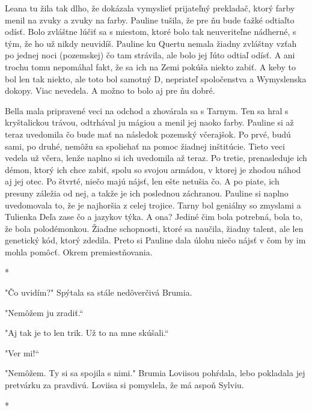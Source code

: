 \documentclass{book}
\begin{document}
Leana tu žila tak dlho, že dokázala vymyslieť prijateľný prekladač, ktorý farby menil na zvuky a zvuky na farby. Pauline tušila, že pre ňu bude ťažké odtiaľto odísť. Bolo zvláštne lúčiť sa s miestom, ktoré bolo tak neuveriteľne nádherné, s tým, že ho už nikdy neuvidíš. Pauline ku Quertu nemala žiadny zvláštny vzťah po jednej noci (pozemskej) čo tam strávila, ale bolo jej ľúto odtiaľ odísť. A ani trochu tomu nepomáhal fakt, že sa ich na Zemi pokúša niekto zabiť. A keby to bol len tak niekto, ale toto bol samotný D, nepriateľ spoločenstva a Wymyslenska dokopy. Viac nevedela. A možno to bolo aj pre ňu dobré.

Bella mala pripravené veci na odchod a zhovárala sa s Tarnym. Ten sa hral s kryštalickou trávou, odtrhával ju mágiou a menil jej naoko farby. Pauline si až teraz uvedomila čo bude mať na následok pozemský včerajšok. Po prvé, budú sami, po druhé, nemôžu sa spoliehať na pomoc žiadnej inštitúcie. Tieto veci vedela už včera, lenže naplno si ich uvedomila až teraz. Po tretie, prenasleduje ich démon, ktorý ich chce zabiť, spolu so svojou armádou, v ktorej je zhodou náhod aj jej otec. Po štvrté, niečo majú nájsť, len ešte netušia čo. A po piate, ich presuny záležia od nej, a takže je ich poslednou záchranou. Pauline si naplno uvedomovala to, že je najhoršia z celej trojice. Tarny bol geniálny so zmyslami a Tulienka Deľa zase čo a jazykov týka. A ona? Jediné čim bola potrebná, bola to, že bola polodémonkou. Žiadne schopnosti, ktoré sa naučila, žiadny talent, ale len genetický kód, ktorý zdedila. Preto si Pauline dala úlohu niečo nájsť v čom by im mohla pomôcť. Okrem premiestňovania.

\begin{center}
*
\end{center}

"$ $Čo uvidím?"$ $ Spýtala sa stále nedôverčivá Brumia.

"$ $Nemôžem ju zradiť.“

"$ $Aj tak je to len trik. Už to na mne skúšali.“

"$ $Ver mi!“

"$ $Nemôžem. Ty si sa spojila s nimi."$ $ Brumia Loviisou pohŕdala, lebo pokladala jej pretvárku za pravdivú. Loviisa si pomyslela, že má aspoň Sylviu.

\begin{center}
*
\end{center}
\end{document}
